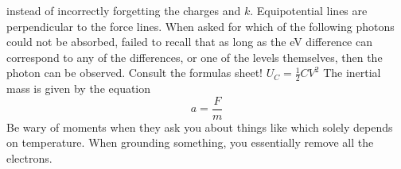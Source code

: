 instead of incorrectly forgetting the charges and $k$.\markdownRendererInterblockSeparator
{}\markdownRendererUlBeginTight
\markdownRendererUlItem Equipotential lines are perpendicular to the force lines.\markdownRendererUlItemEnd 
\markdownRendererUlItem When asked for which of the following photons could not be absorbed, failed to recall that as long as the eV difference can correspond to any of the differences, or one of the levels themselves, then the photon can be observed.\markdownRendererUlItemEnd 
\markdownRendererUlItem Consult the formulas sheet! $U_C = \frac{1}{2}CV^2$\markdownRendererUlItemEnd 
\markdownRendererUlItem The inertial mass is given by the equation $$a = \frac{F}{m}$$\markdownRendererUlItemEnd 
\markdownRendererUlItem Be wary of moments when they ask you about things like  which solely depends on temperature.\markdownRendererUlItemEnd 
\markdownRendererUlItem When grounding something, you essentially remove all the electrons.\markdownRendererUlItemEnd 
\markdownRendererUlEndTight \relax